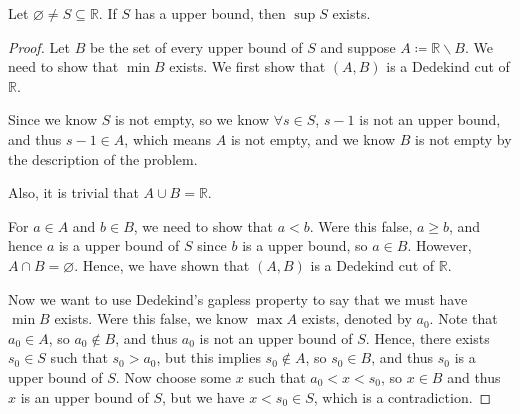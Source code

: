 \begin{theorem}[Weierstrass]\label{thm: Weierstrass}
	Let \(\varnothing \neq S \subseteq \mathbb{R} \). If \(S\) has a upper bound, then \(\sup S\) exists.   
\end{theorem}
\begin{proof}
	Let \(B\) be the set of every upper bound of \(S\) and suppose \(A\coloneqq \mathbb{R} \backslash B\). We need to show that \(\min B\) exists. We first show that \((A,B)\) is a Dedekind cut of \(\mathbb{R} \).
	
	Since we know \(S\) is not empty, so we know \(\forall s \in S\), \(s-1\) is not an upper bound, and thus \(s-1 \in A\), which means \(A\) is not empty, and we know \(B\) is not empty by the description of the problem. 
	
	Also, it is trivial that \(A \cup B = \mathbb{R} \). 
	
	For \(a \in A\) and \(b \in B\), we need to show that \(a < b\). Were this false, \(a \ge b\), and hence \(a\) is a upper bound of \(S\) since \(b\) is a upper bound, so \(a \in B\). However, \(A \cap B = \varnothing \). Hence, we have shown that \((A,B)\) is a Dedekind cut of \(\mathbb{R} \). 
	
	Now we want to use Dedekind's gapless property to say that we must have \(\min B\) exists. Were this false, we know \(\max A\) exists, denoted by \(a_0\). Note that \(a_0 \in A\), so \(a_0 \notin B\), and thus \(a_0\) is not an upper bound of \(S\). Hence, there exists \(s_0 \in S\) such that \(s_0 > a_0\), but this implies \(s_0 \notin A\), so \(s_0 \in B\), and thus \(s_0\) is a upper bound of \(S\). Now choose some \(x\) such that \(a_0 < x < s_0\), so \(x \in B\) and thus \(x\) is an upper bound of \(S\), but we have \(x < s_0 \in S\), which is a contradiction.         
\end{proof}

